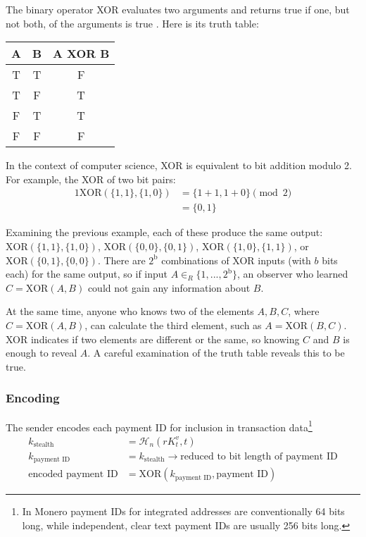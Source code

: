 The binary operator XOR evaluates two arguments and returns true if one, but not both, of the arguments is true \cite{wolfram-xor}. Here is its truth table:

\begin{center}
    \begin{tabular}{|c|c|c|}
    \hline
        A & B & A XOR B \\
    \hline\hline
        T & T & F \\
    \hline
        T & F & T \\
    \hline
        F & T & T \\
    \hline
        F & F & F \\
    \hline
    \end{tabular}
\end{center}

In the context of computer science, XOR is equivalent to bit addition modulo 2. For example, the XOR of two bit pairs:
\begin{alignat*}{1}
    \text{XOR}(\{1,1\},\{1,0\}) &= \{1+1,1+0\} \pmod 2 \\
                                &= \{0,1\} 
\end{alignat*}

Examining the previous example, each of these produce the same output: $\text{XOR}(\{1,1\},\{1,0\})$, $\text{XOR}(\{0,0\},\{0,1\})$, $\text{XOR}(\{1,0\},\{1,1\})$, or $\text{XOR}(\{0,1\},\{0,0\})$. There are $2^{\text{b}}$ combinations of XOR inputs (with $b$ bits each) for the same output, so if input $A \in_R \{1,...,2^{\text{b}}\}$, an observer who learned $C = \text{XOR}(A,B)$ could not gain any information about $B$.

At the same time, anyone who knows two of the elements $A,B,C$, where $C = \text{XOR}(A,B)$, can calculate the third element, such as $A = \text{XOR}(B,C)$. XOR indicates if two elements are different or the same, so knowing $C$ and $B$ is enough to reveal $A$. A careful examination of the truth table reveals this to be true.
    
\subsubsection*{Encoding}

The sender encodes each payment ID for inclusion in transaction data\footnote{In Monero payment IDs for integrated addresses are conventionally 64 bits long, while independent, clear text payment IDs are usually 256 bits long.}\\
\begin{align*}
         k_{\textrm{stealth}} &= \mathcal{H}_n(r K_t^v, t) \\
      k_{\textrm{payment ID}} &= k_{\textrm{stealth}} \rightarrow \textrm{reduced to bit length of payment ID}\\
  \textrm{encoded payment ID} &= \textrm{XOR}(k_{\textrm{payment ID}}, \textrm{payment ID})
\end{align*}
    
